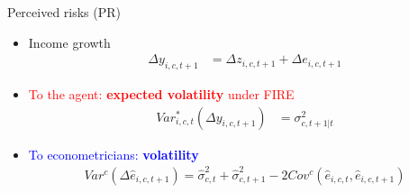 \documentclass{beamer}
\begin{document}
\begin{frame}{Perceived risks (PR)}
	\begin{itemize}
		\item Income growth 
		\begin{equation*}
			\begin{split}
				\Delta y_{i,c,t+1} & =\Delta z_{i,c,t+1} +\Delta e_{i,c,t+1} 
			\end{split}
		\end{equation*}
		\item \textcolor{red}{To the agent: \textbf{expected volatility} under FIRE}
		\begin{equation*}
			\begin{split}
				Var^*_{i,c,t}(\Delta y_{i,c,t+1}) & =\sigma^2_{c,t+1|t}
			\end{split}
		\end{equation*}
		\item \textcolor{blue}{To econometricians: \textbf{volatility} } 
		\begin{equation*}
			\begin{split}
			Var^c(\Delta \hat e_{i,c,t+1})     = \hat\sigma^2_{c,t}+ \hat\sigma^2_{c,t+1} - 2Cov^c(\hat e_{i,c,t},\hat e_{i,c,t+1})
			\end{split}
		\end{equation*}
	\end{itemize}	
\end{frame}
\end{document}
